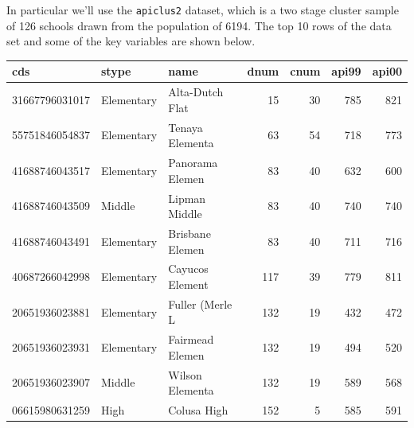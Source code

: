 \documentclass[
]{book}
\newenvironment{Shaded}{\begin{snugshade}}{\end{snugshade}}
\newcommand{\AttributeTok}[1]{\textcolor[rgb]{0.13,0.29,0.53}{#1}}
\newcommand{\FunctionTok}[1]{\textcolor[rgb]{0.13,0.29,0.53}{\textbf{#1}}}
\newcommand{\NormalTok}[1]{#1}
\newcommand{\OtherTok}[1]{\textcolor[rgb]{0.56,0.35,0.01}{#1}}
\newcommand{\SpecialCharTok}[1]{\textcolor[rgb]{0.81,0.36,0.00}{\textbf{#1}}}
\newcommand{\StringTok}[1]{\textcolor[rgb]{0.31,0.60,0.02}{#1}}
\begin{document}
In particular we'll use the \texttt{apiclus2} dataset, which is a two stage
cluster sample of 126 schools drawn from the population of 6194.
The top 10 rows of the data set and some of the key variables are shown below.

\begin{Shaded}
\end{Shaded}

\begin{table}
\centering
\begin{tabular}[t]{l|l|l|r|r|r|r}
\hline
cds & stype & name & dnum & cnum & api99 & api00\\
\hline
31667796031017 & Elementary & Alta-Dutch Flat & 15 & 30 & 785 & 821\\
\hline
55751846054837 & Elementary & Tenaya Elementa & 63 & 54 & 718 & 773\\
\hline
41688746043517 & Elementary & Panorama Elemen & 83 & 40 & 632 & 600\\
\hline
41688746043509 & Middle & Lipman Middle & 83 & 40 & 740 & 740\\
\hline
41688746043491 & Elementary & Brisbane Elemen & 83 & 40 & 711 & 716\\
\hline
40687266042998 & Elementary & Cayucos Element & 117 & 39 & 779 & 811\\
\hline
20651936023881 & Elementary & Fuller (Merle L & 132 & 19 & 432 & 472\\
\hline
20651936023931 & Elementary & Fairmead Elemen & 132 & 19 & 494 & 520\\
\hline
20651936023907 & Middle & Wilson Elementa & 132 & 19 & 589 & 568\\
\hline
06615980631259 & High & Colusa High & 152 & 5 & 585 & 591\\
\hline
\end{tabular}
\end{table}
\end{document}

